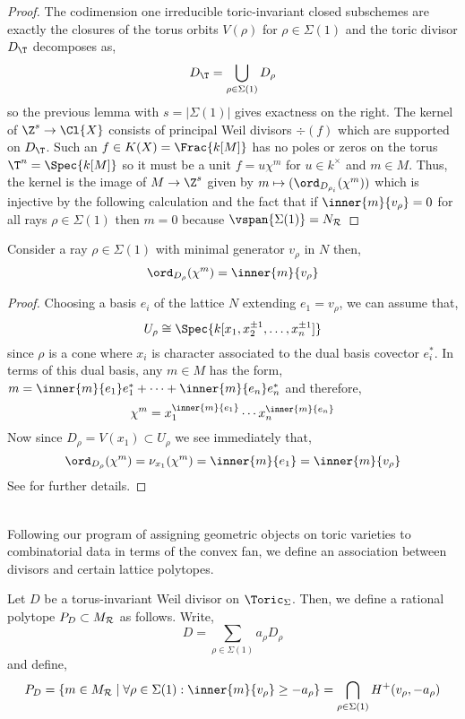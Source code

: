 \begin{proof}
The codimension one irreducible toric-invariant closed subschemes are exactly the closures of the torus orbits $V(\rho)$ for $\rho \in \Sigma(1)$ and the toric divisor $D_\T$ decomposes as,
\[ D_\T = \bigcup_{\rho \in \Sigma(1)} D_\rho \]
so the previous lemma with $s = |\Sigma(1)|$ gives exactness on the right. The kernel of $\Z^s \to \Cl{X}$ consists of principal Weil divisors $\div{(f)}$ which are supported on $D_\T$. Such an $f \in K(X) = \Frac{k[M]}$ has no poles or zeros on the torus $\T^n = \Spec{k[M]}$ so it must be a unit $f = u \chi^m$ for $u \in k^\times$ and $m \in M$. Thus, the kernel is the image of $M \to \Z^s$ given by $m \mapsto (\ord_{D_{\rho_i}}(\chi^m))$ which is injective by the following calculation and the fact that if $\inner{m}{v_\rho} = 0$ for all rays $\rho \in \Sigma(1)$ then $m = 0$ because $\vspan{\Sigma(1)} = N_\R$ 
\end{proof}

\begin{lemma} \label{order_formula}
Consider a ray $\rho \in \Sigma(1)$ with minimal generator $v_\rho$ in $N$ then,
\[ \ord_{D_\rho}(\chi^m) = \inner{m}{v_\rho} \]
\end{lemma}

\begin{proof}
Choosing a basis $e_i$ of the lattice $N$ extending $e_1 = v_\rho$, we can assume that,
\[ U_\rho \cong \Spec{k[x_1, x_2^{\pm 1}, \dots, x_n^{\pm 1}]} \]
since $\rho$ is a cone where $x_i$ is character associated to the dual basis covector $e_i^*$. In terms of this dual basis, any $m \in M$ has the form, $m = \inner{m}{e_1} e_1^* + \cdots + \inner{m}{e_n} e_n^*$ and therefore,
\[ \chi^m = x_1^{\inner{m}{e_1}} \cdots x_n^{\inner{m}{e_n}} \]
Now since $D_\rho = V(x_1) \subset U_\rho$ we see immediately that,
\[ \ord_{D_\rho}{(\chi^m)} = \nu_{x_1}(\chi^m) = \inner{m}{e_1} = \inner{m}{v_\rho} \]
See \cite[Prop. 4.1.1]{cox} for further details.
\end{proof}
\noindent\\
Following our program of assigning geometric objects on toric varieties to combinatorial data in terms of the convex fan, we define an association between divisors and certain lattice polytopes. 

\begin{defn}
Let $D$ be a torus-invariant Weil divisor on $\Toric_\Sigma$. Then, we define a rational polytope $P_D \subset M_{\mathcal{R}}$ as follows. Write,
\[ D = \sum_{\rho \in \Sigma(1)} a_\rho D_\rho \]
and define,
\[ P_D = \{ m \in M_\R \mid \forall \rho \in \Sigma(1) : \inner{m}{v_\rho} \ge - a_\rho \} = \bigcap_{\rho \in \Sigma(1)} H^+(v_\rho, -a_\rho) \]
\end{defn}


